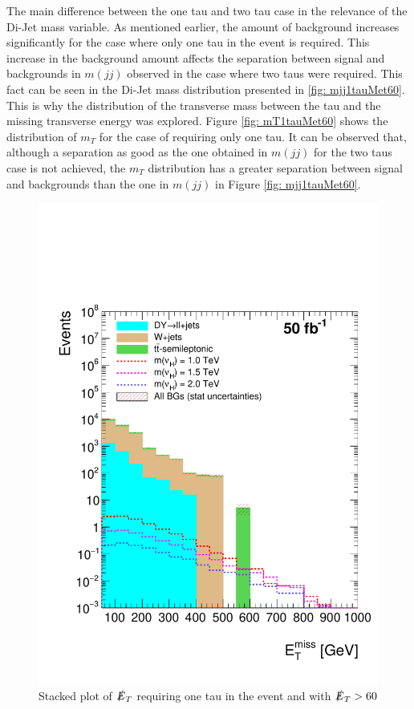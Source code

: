 The main difference between the one tau and two tau case in the relevance of the Di-Jet mass variable. As mentioned earlier, the amount of background increases significantly for the case where only one tau in the event is required. This increase in the background amount affects the separation between signal and backgrounds in $m(jj)$ observed in the case where two taus were required. This fact can be seen in the Di-Jet mass distribution presented in \ref{fig: mjj1tauMet60}. This is why the distribution of the transverse mass between the tau and the missing transverse energy was explored. Figure \ref{fig: mT1tauMet60} shows the distribution of $m_{T}$ for the case of requiring only one tau. It can be observed that, although a separation as good as the one obtained in $m(jj)$ for the two taus case is not achieved, the $m_{T}$ distribution has a greater separation between signal and backgrounds than the one in $m(jj)$ in Figure \ref{fig: mjj1tauMet60}.


\begin{figure}[H]
\centering
\includegraphics[width=\linewidth]{StackPlots/MET_1Tau_met60_50ifb.pdf}
\caption{Stacked plot of $\slashed{E}_{T}$ requiring one tau in the event and with $\slashed{E}_{T} > 60$}
\label{fig: MET1tauMet60}
\end{figure}

